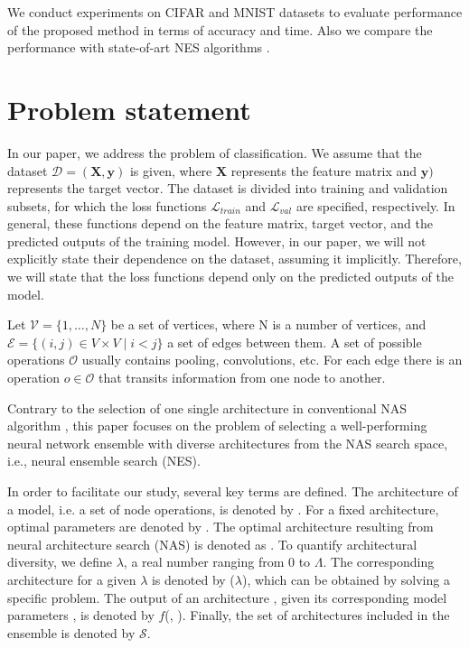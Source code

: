\documentclass{article}
\begin{document}
We conduct experiments on CIFAR and MNIST datasets to evaluate performance of the proposed method in terms of accuracy and time. Also we compare the performance with state-of-art NES algorithms \citep{nes, baysiannes}.

\section{Problem statement}

In our paper, we address the problem of classification. We assume that the dataset $\mathcal{D} = (\mathbf{X}, \mathbf{y})$ is given, where $\mathbf{X}$ represents the feature matrix and $\mathbf{y})$ represents the target vector. The dataset is divided into training and validation subsets, for which the loss functions $\mathcal{L}_{train}$ and $\mathcal{L}_{val}$ are specified, respectively. In general, these functions depend on the feature matrix, target vector, and the predicted outputs of the training model. However, in our paper, we will not explicitly state their dependence on the dataset, assuming it implicitly. Therefore, we will state that the loss functions depend only on the predicted outputs of the model.

Let $\mathcal{V} = \{ 1, \ldots, N \}$ be a set of vertices, where N is a number of vertices, and $\mathcal{E} = \{ (i, j) \in V \times V \mid i < j \}$ a set of edges between them. A set of possible operations
$\mathcal{O}$ usually contains pooling, convolutions, etc.
For each edge there is an operation $o \in \mathcal{O}$ that transits information from one node to another.

Contrary to the selection of one single architecture in conventional NAS algorithm \citep{darts, enas, nas}, this paper focuses on the problem of selecting a well-performing neural network ensemble with diverse architectures from the NAS search space, i.e., neural ensemble search (NES).

In order to facilitate our study, several key terms are defined. The architecture of a model, i.e. a set of node operations, is denoted by \mbox{\boldmath{$\alpha$}}. For a fixed architecture, optimal parameters are denoted by \mbox{}.
The optimal architecture resulting from neural architecture search (NAS) is denoted as \mbox{\boldmath{$\alpha^*$}}. 
To quantify architectural diversity, we define $\lambda$, a real number ranging from 0 to $\Lambda$.
The corresponding architecture for a given $\lambda$ is denoted by \mbox{\boldmath{$\alpha$}}($\lambda$), which can be obtained by solving a specific problem.
The output of an architecture \mbox{\boldmath{$\alpha$}}, given its corresponding model parameters \mbox{}, is denoted by $f$(\mbox{}, \mbox{\boldmath{$\alpha$}}).
Finally, the set of architectures included in the ensemble is denoted by $\mathcal{S}$.
\end{document}

